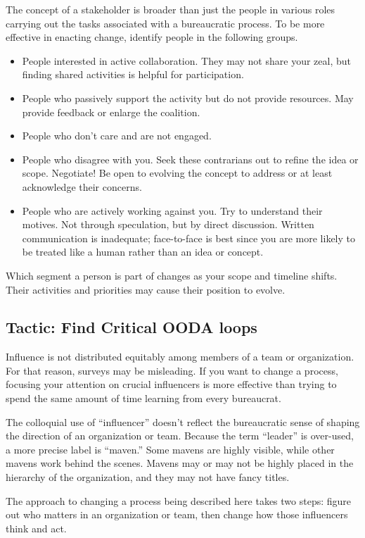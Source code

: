 The concept of a \gls{stakeholder} is broader than just the people in various roles carrying out the tasks associated with a bureaucratic process. 
To be more effective in enacting change, identify people in the following groups. 
\begin{itemize}
 \item People interested in active collaboration. They may not share your zeal, but finding shared activities is helpful for participation.
    \item People who passively support the activity but do not provide resources. May provide feedback or enlarge the coalition.
    \item People who don't care and are not engaged.
    \item People who disagree with you. Seek these contrarians out to refine the idea or scope. Negotiate! Be open to evolving the concept to address or at least acknowledge their concerns.
    \item People who are actively working against you. Try to understand their motives. Not through speculation, but by direct discussion. Written communication is inadequate; face-to-face is best since you are more likely to be treated like a human rather than an idea or concept. 
\end{itemize}

Which segment a person is part of changes as your scope and timeline shifts. Their activities and priorities may cause their position to evolve. 

\subsection*{Tactic: Find Critical OODA loops}

Influence is not distributed equitably among members of a team or organization. For that reason, surveys may be misleading. If you want to change a process, focusing your attention on crucial influencers is more effective than trying to spend the same amount of time learning from every bureaucrat. 

The colloquial use of ``influencer'' doesn't reflect the bureaucratic sense of shaping the direction of an organization or team. Because the term ``leader'' is over-used, a more precise label is ``maven.'' Some mavens are highly visible, while other mavens work behind the scenes.
Mavens may or may not be highly placed in the hierarchy of the organization, and they may not have fancy titles. 

The approach to changing a process being described here takes two steps: figure out who matters in an organization or team, then change how those influencers think and act.

